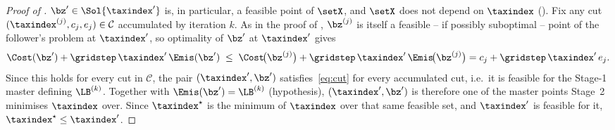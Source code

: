 \begin{proof}[Proof of ]
$\bz'\in\Sol{\taxindex'}$ is, in particular, a feasible point of
$\setX$, and $\setX$ does not depend on $\taxindex$
(). Fix any cut $(\taxindex^{(j)},c_{j},e_{j})
\in\mathcal{C}$ accumulated by iteration $k$. As in the proof of
, $\bz^{(j)}$ is itself a feasible -- if
possibly suboptimal -- point of the follower's problem at $\taxindex'$,
so optimality of $\bz'$ at $\taxindex'$ gives
\begin{equation*}
\Cost(\bz')+\gridstep\,\taxindex'\,\Emis(\bz')
\;\le\;
\Cost\!\bigl(\bz^{(j)}\bigr)+\gridstep\,\taxindex'\,\Emis\!\bigl(\bz^{(j)}\bigr)
= c_{j}+\gridstep\,\taxindex'\,e_{j}.
\end{equation*}
Since this holds for every cut in $\mathcal{C}$, the pair
$(\taxindex',\bz')$ satisfies~\eqref{eq:cut} for every accumulated cut,
i.e.\ it is feasible for the Stage-1 master defining $\LB^{(k)}$.
Together with $\Emis(\bz')=\LB^{(k)}$ (hypothesis), $(\taxindex',\bz')$
is therefore one of the master points Stage~2 minimises $\taxindex$
over. Since $\taxindex^{\star}$ is the minimum of $\taxindex$ over that
same feasible set, and $\taxindex'$ is feasible for it,
$\taxindex^{\star}\le\taxindex'$.
\end{proof}

